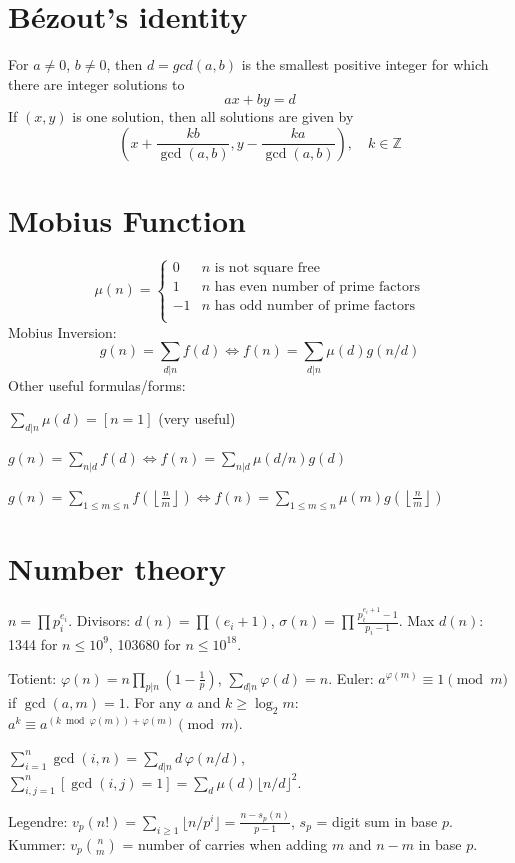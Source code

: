 \section{Bézout's identity}
For $a \neq 0$, $b \neq 0$, then $d=gcd(a,b)$ is the smallest positive integer for which there are integer solutions to
$$ax+by=d$$
If $(x,y)$ is one solution, then all solutions are given by
$$\left(x+\frac{kb}{\gcd(a,b)}, y-\frac{ka}{\gcd(a,b)}\right), \quad k\in\mathbb{Z}$$

\section{Mobius Function}
\[
	\mu(n) = \begin{cases} 0 & n \textrm{ is not square free}\\ 1 & n \textrm{ has even number of prime factors}\\ -1 & n \textrm{ has odd number of prime factors}\\\end{cases}
\]
  Mobius Inversion:
  \[ g(n) = \sum_{d|n} f(d) \Leftrightarrow f(n) = \sum_{d|n} \mu(d)g(n/d) \]
  Other useful formulas/forms:

  $ \sum_{d | n} \mu(d) = [ n = 1] $ (very useful)

  $ g(n) = \sum_{n|d} f(d) \Leftrightarrow f(n) = \sum_{n|d} \mu(d/n)g(d)$

 $ g(n) = \sum_{1 \leq m \leq n} f(\left\lfloor\frac{n}{m}\right \rfloor ) \Leftrightarrow f(n) = \sum_{1\leq m\leq n} \mu(m)g(\left\lfloor\frac{n}{m}\right\rfloor)$



\section{Number theory}
$n = \prod p_i^{e_i}$. Divisors: $d(n) = \prod (e_i + 1)$, $\sigma(n) = \prod \frac{p_i^{e_i+1} - 1}{p_i - 1}$.
Max $d(n)$: 1344 for $n \le 10^9$, 103680 for $n \le 10^{18}$.

Totient: $\varphi(n) = n \prod_{p | n} (1 - \frac1p)$, $\sum_{d|n} \varphi(d) = n$.
Euler: $a^{\varphi(m)} \equiv 1 \pmod m$ if $\gcd(a, m) = 1$. For any $a$ and
$k \ge \log_2 m$: $a^k \equiv a^{(k \bmod \varphi(m)) + \varphi(m)} \pmod m$.

$\sum_{i=1}^n \gcd(i, n) = \sum_{d|n} d\,\varphi(n/d)$,\quad
$\sum_{i,j=1}^n [\gcd(i,j)=1] = \sum_d \mu(d) \lfloor n/d \rfloor^2$.

Legendre: $v_p(n!) = \sum_{i \ge 1} \lfloor n / p^i \rfloor = \frac{n - s_p(n)}{p - 1}$, $s_p$ = digit sum in base $p$.
Kummer: $v_p\binom{n}{m}$ = number of carries when adding $m$ and $n - m$ in base $p$.

